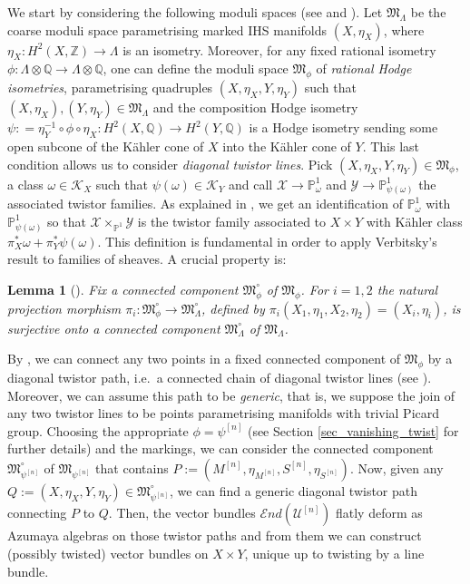\documentclass[12pt,a4paper]{amsart}
\theoremstyle{plain}
\newtheorem{lem}[thm]{Lemma}
\theoremstyle{definition}
\theoremstyle{remark}
\def\Z{\mathbb{Z}}
\def\H{H}
\def\PP{\mathbb{P}}
\def\QQ{\mathbb{Q}}
\def\Mf{\mathfrak{M}}
\newcommand{\Lambdan}{{\Lambda}}
\newcommand{\psin}{{\psi^{[n]}}}
\newcommand{\cEnd}{\mathcal{E}nd}
\begin{document}
We start by considering the following moduli spaces (see \cite{buskin-hodge-isometry-k3} and \cite{markman}). Let 
$\mathfrak{M}_\Lambdan$ be the coarse moduli space parametrising marked IHS manifolds $(X,\eta_X)$, where $\eta_X\colon \H^2(X,\Z)\to \Lambdan$ is an isometry.
Moreover, for any fixed rational isometry $\phi:\Lambdan \otimes \QQ\to \Lambdan \otimes \QQ$, one can define the moduli space  $\mathfrak{M}_\phi$ of \textit{rational Hodge isometries}, parametrising quadruples $(X,\eta_X,Y,\eta_Y)$ such that $(X,\eta_X),(Y,\eta_Y)\in \mathfrak{M}_\Lambdan$ and the composition  Hodge isometry $\psi: =\eta_Y^{-1}\circ \phi\circ \eta_X \colon \H^2(X,\QQ)\to \H^2(Y,\QQ)$ is a Hodge isometry sending some open subcone of the K\"ahler cone of $X$ into the K\"ahler cone of $Y$.
This last condition allows us to consider \textit{diagonal twistor lines}.
Pick $(X,\eta_X,Y,\eta_Y)\in \mathfrak{M}_\phi$, a class $\omega\in \mathcal{K}_X$ such that $\psi(\omega)\in \mathcal{K}_Y$ and call $\mathcal{X} \rightarrow \mathbb{P}^1_\omega$ and $\mathcal{Y} \rightarrow \mathbb{P}^1_{\psi(\omega)}$ the associated twistor families.
As explained in \cite[§5.3]{markman}, we get an identification of $\PP^1_{\omega}$ with $\PP^1_{\psi(\omega)}$ so that $\mathcal{X}\times_{\PP^1}\mathcal{Y}$ is the twistor family associated to $X\times Y$ with K\"{a}hler class $\pi_X^*\omega+\pi_Y^*\psi(\omega)$.
This definition is fundamental in order to apply Verbitsky's result to families of sheaves. A crucial property is:
\begin{lem}[{\cite[Lemma~5.14]{markman}}]\label{lem_pisurj}
Fix a connected component $\Mf_{\phi}^{\circ}$ of $\Mf_{\phi}$.
For $i=1,2$ the natural projection morphism $\pi_i\colon \Mf_{\phi}^{\circ}\to \mathfrak{M}_{\Lambdan}^{\circ}$, defined by $\pi_i(X_1,\eta_1,X_2,\eta_2)= (X_i,\eta_i)$, is surjective onto a connected component $\mathfrak{M}_{\Lambdan}^{\circ}$ of $\mathfrak{M}_{\Lambdan}$. 
\end{lem}


By \cite[Lemma 5.8]{markman}, we can connect any two points in a fixed connected component of $\mathfrak{M}_\phi$ by a diagonal twistor path, i.e.~a connected chain of diagonal twistor lines (see \cite[Definition 5.6]{markman}).
Moreover, we can assume this path to be \textit{generic}, that is, we suppose the join of any two twistor lines to be points parametrising manifolds with trivial Picard group.
Choosing the appropriate  $\phi=\psin$ (see Section \ref{sec_vanishing_twist} for further details) and the markings, we can consider the connected component $\mathfrak{M}_\psin^\circ$ of $\mathfrak{M}_\psin$ that contains $P:=(M^{[n]},\eta_{M^{[n]}},S^{[n]},\eta_{S^{[n]}})$.
Now, given any $Q:=(X,\eta_X,Y,\eta_Y)\in\mathfrak{M}^\circ_\psin$, we can find a generic diagonal twistor path connecting $P$ to $Q$.
Then, the vector bundles $\cEnd(\mathcal{U}^{[n]})$ flatly deform as Azumaya algebras on those twistor paths and from them we can construct (possibly twisted) vector bundles on $X\times Y$, unique up to twisting by a line bundle.
\end{document}

